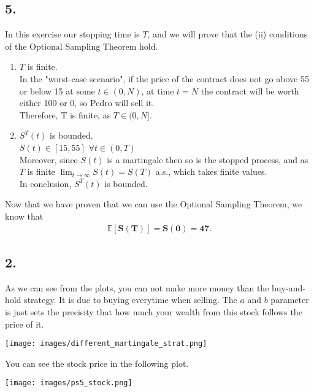 \subsection*{5.}
In this exercise our stopping time is $T$, and we will prove that the (ii) conditions of the Optional Sampling Theorem hold.
\begin{enumerate}
    \item $T$ is finite.\\
    In the "worst-case scenario", if the price of the contract does not go above 55 or below 15 at some $t \in (0,N)$, at time $t=N$ the contract will be worth either 100 or 0, so Pedro will sell it.\\
    Therefore, T is finite, as $T \in (0,N]$.
    \item $S^{T}(t)$ is bounded.\\
    $S(t) \in [15,55]$ $\forall t \in (0,T)$\\
    Moreover, since $S(t)$ is a martingale then so is the stopped process, and as $T$ is finite $\lim_{t \to \infty} S(t) = S(T)$ a.s., which takes finite values.\\
    In conclusion, $S^{T}(t)$ is bounded.
\end{enumerate}
Now that we have proven that we can use the Optional Sampling Theorem, we know that
\begin{gather*}
    \mathbf{\mathbb{E}[S(T)]=S(0) = 47}.
\end{gather*}
\newpage
\subsection*{2.}
As we can see from the plots, you can not make more money than the buy-and-hold strategy. It is due to buying everytime when selling. The $a$ and $b$ parameter is just sets the precisity that how much your wealth from this stock follows the price of it.  
\begin{center}
    \texttt{[image: images/different\_martingale\_strat.png]}
\end{center}
You can see the stock price in the following plot.
\begin{center}
    \texttt{[image: images/ps5\_stock.png]}
\end{center}
